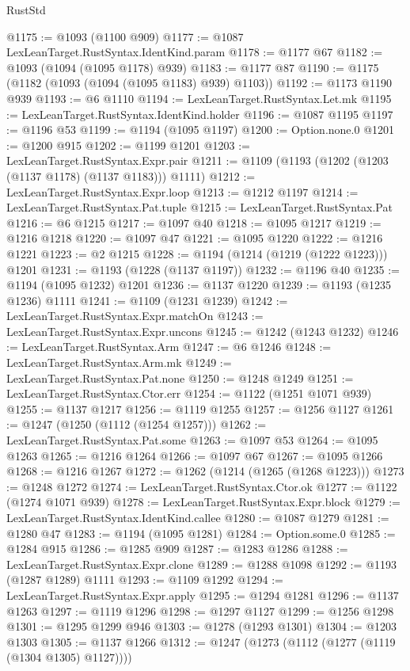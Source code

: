 \begin{lexlean}{RustStd}
\begin{coremodule}
{\begin{coremodule}
{{{{{{{{{{{{{{{{{{{{{{{{{{{{{{{@1175 := @1093 (@1100 @909)
@1177 := @1087 LexLeanTarget.RustSyntax.IdentKind.param
@1178 := @1177 @67
@1182 := @1093 (@1094 (@1095 @1178) @939)
@1183 := @1177 @87
@1190 := @1175 (@1182 (@1093 (@1094 (@1095 @1183) @939) @1103))
@1192 := @1173 @1190 @939
@1193 := @6 @1110
@1194 := LexLeanTarget.RustSyntax.Let.mk
@1195 := LexLeanTarget.RustSyntax.IdentKind.holder
@1196 := @1087 @1195
@1197 := @1196 @53
@1199 := @1194 (@1095 @1197)
@1200 := Option.none.{0}
@1201 := @1200 @915
@1202 := @1199 @1201
@1203 := LexLeanTarget.RustSyntax.Expr.pair
@1211 := @1109 (@1193 (@1202 (@1203 (@1137 @1178) (@1137 @1183))) @1111)
@1212 := LexLeanTarget.RustSyntax.Expr.loop
@1213 := @1212 @1197
@1214 := LexLeanTarget.RustSyntax.Pat.tuple
@1215 := LexLeanTarget.RustSyntax.Pat
@1216 := @6 @1215
@1217 := @1097 @40
@1218 := @1095 @1217
@1219 := @1216 @1218
@1220 := @1097 @47
@1221 := @1095 @1220
@1222 := @1216 @1221
@1223 := @2 @1215
@1228 := @1194 (@1214 (@1219 (@1222 @1223))) @1201
@1231 := @1193 (@1228 (@1137 @1197))
@1232 := @1196 @40
@1235 := @1194 (@1095 @1232) @1201
@1236 := @1137 @1220
@1239 := @1193 (@1235 @1236) @1111
@1241 := @1109 (@1231 @1239)
@1242 := LexLeanTarget.RustSyntax.Expr.matchOn
@1243 := LexLeanTarget.RustSyntax.Expr.uncons
@1245 := @1242 (@1243 @1232)
@1246 := LexLeanTarget.RustSyntax.Arm
@1247 := @6 @1246
@1248 := LexLeanTarget.RustSyntax.Arm.mk
@1249 := LexLeanTarget.RustSyntax.Pat.none
@1250 := @1248 @1249
@1251 := LexLeanTarget.RustSyntax.Ctor.err
@1254 := @1122 (@1251 @1071 @939)
@1255 := @1137 @1217
@1256 := @1119 @1255
@1257 := @1256 @1127
@1261 := @1247 (@1250 (@1112 (@1254 @1257)))
@1262 := LexLeanTarget.RustSyntax.Pat.some
@1263 := @1097 @53
@1264 := @1095 @1263
@1265 := @1216 @1264
@1266 := @1097 @67
@1267 := @1095 @1266
@1268 := @1216 @1267
@1272 := @1262 (@1214 (@1265 (@1268 @1223)))
@1273 := @1248 @1272
@1274 := LexLeanTarget.RustSyntax.Ctor.ok
@1277 := @1122 (@1274 @1071 @939)
@1278 := LexLeanTarget.RustSyntax.Expr.block
@1279 := LexLeanTarget.RustSyntax.IdentKind.callee
@1280 := @1087 @1279
@1281 := @1280 @47
@1283 := @1194 (@1095 @1281)
@1284 := Option.some.{0}
@1285 := @1284 @915
@1286 := @1285 @909
@1287 := @1283 @1286
@1288 := LexLeanTarget.RustSyntax.Expr.clone
@1289 := @1288 @1098
@1292 := @1193 (@1287 @1289) @1111
@1293 := @1109 @1292
@1294 := LexLeanTarget.RustSyntax.Expr.apply
@1295 := @1294 @1281
@1296 := @1137 @1263
@1297 := @1119 @1296
@1298 := @1297 @1127
@1299 := @1256 @1298
@1301 := @1295 @1299 @946
@1303 := @1278 (@1293 @1301)
@1304 := @1203 @1303
@1305 := @1137 @1266
@1312 := @1247 (@1273 (@1112 (@1277 (@1119 (@1304 @1305) @1127))))
}}}}}}}}}}}}}}}}}}}}}}}}}}}}}}}
\end{coremodule}}
\end{coremodule}
\end{lexlean}

